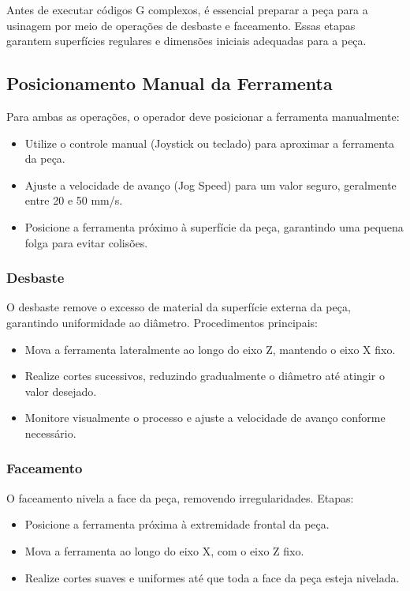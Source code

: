 Antes de executar códigos G complexos, é essencial preparar a peça para a usinagem por meio de operações de desbaste e faceamento. Essas etapas garantem superfícies regulares e dimensões iniciais adequadas para a peça.

\subsection{Posicionamento Manual da Ferramenta}

Para ambas as operações, o operador deve posicionar a ferramenta manualmente:

\begin{itemize}
    \item Utilize o controle manual (Joystick ou teclado) para aproximar a ferramenta da peça.
    \item Ajuste a velocidade de avanço (Jog Speed) para um valor seguro, geralmente entre 20 e 50 mm/s.
    \item Posicione a ferramenta próximo à superfície da peça, garantindo uma pequena folga para evitar colisões.
\end{itemize}

\subsubsection{Desbaste}

O desbaste remove o excesso de material da superfície externa da peça, garantindo uniformidade ao diâmetro. Procedimentos principais:

\begin{itemize}
    \item Mova a ferramenta lateralmente ao longo do eixo Z, mantendo o eixo X fixo.
    \item Realize cortes sucessivos, reduzindo gradualmente o diâmetro até atingir o valor desejado.
    \item Monitore visualmente o processo e ajuste a velocidade de avanço conforme necessário.
\end{itemize}

\subsubsection{Faceamento}

O faceamento nivela a face da peça, removendo irregularidades. Etapas:

\begin{itemize}
    \item Posicione a ferramenta próxima à extremidade frontal da peça.
    \item Mova a ferramenta ao longo do eixo X, com o eixo Z fixo.
    \item Realize cortes suaves e uniformes até que toda a face da peça esteja nivelada.
\end{itemize}

